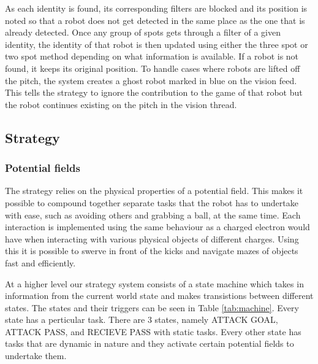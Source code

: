 \documentclass[a4paper,12pt]{article}
\begin{document}
\medskip

As each identity is found, its corresponding filters are blocked and its position is noted so that a robot does not get detected in the same place as the one that is already detected. Once any group of spots gets through a filter of a given identity, the identity of that robot is then updated using either the three spot or two spot method depending on what information is available. If a robot is not found, it keeps its original position. To handle cases where robots are lifted off the pitch, the system creates a ghost robot marked in blue on the vision feed. This tells the strategy to ignore the contribution to the game of that robot but the robot continues existing on the pitch in the vision thread.

\subsection{Strategy}

\subsubsection{Potential fields}

The strategy relies on the physical properties of a potential field. This makes it possible to compound together separate tasks that the robot has to undertake with ease, such as avoiding others and grabbing a ball, at the same time. Each interaction is implemented using the same behaviour as a charged electron would have when interacting with various physical objects of different charges. Using this it is possible to swerve in front of the kicks and navigate mazes of objects fast and efficiently. 

At a higher level our strategy system consists of a state machine which takes in information from the current world state and makes transistions between different states. The states and their triggers can be seen in Table \ref{tab:machine}. Every state has a perticular task. There are 3 states, namely ATTACK GOAL, ATTACK PASS, and RECIEVE PASS with static tasks. Every other state has tasks that are dynamic in nature and they activate certain potential fields to undertake them. 
\end{document}
